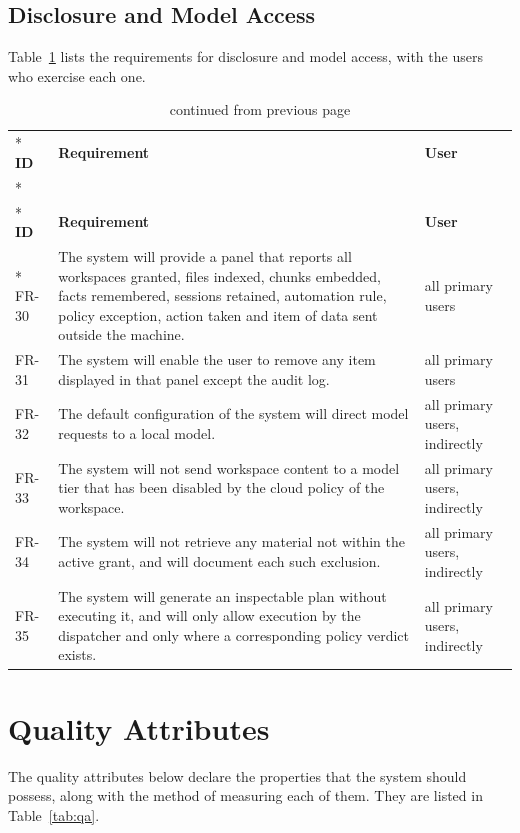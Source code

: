 \documentclass{FastFyp}
\begin{document}
\subsection{Disclosure and Model Access}
Table~\ref{tab:fr4} lists the requirements for disclosure and model access, with the users who exercise each one.

{\small
{}
\begin{longtable}{|p{1.3cm}|p{9.8cm}|p{3.0cm}|}
\caption{Functional requirements: disclosure and model access.}\label{tab:fr4}\\*
\hline
\textbf{ID} & \textbf{Requirement} & \textbf{User} \\*
\hline
\endfirsthead
\caption[]{continued from previous page}\\*
\hline
\textbf{ID} & \textbf{Requirement} & \textbf{User} \\*
\hline
\endhead
FR-30 & The system will provide a panel that reports all workspaces granted, files indexed, chunks embedded, facts remembered, sessions retained, automation rule, policy exception, action taken and item of data sent outside the machine. & all primary users \\
\hline
FR-31 & The system will enable the user to remove any item displayed in that panel except the audit log. & all primary users \\
\hline
FR-32 & The default configuration of the system will direct model requests to a local model. & all primary users, indirectly \\
\hline
FR-33 & The system will not send workspace content to a model tier that has been disabled by the cloud policy of the workspace. & all primary users, indirectly \\
\hline
FR-34 & The system will not retrieve any material not within the active grant, and will document each such exclusion. & all primary users, indirectly \\
\hline
FR-35 & The system will generate an inspectable plan without executing it, and will only allow execution by the dispatcher and only where a corresponding policy verdict exists. & all primary users, indirectly \\
\hline
\end{longtable}
}

\section{Quality Attributes}
The quality attributes below declare the properties that the system should possess, along with the method of measuring each of them. They are listed in Table~\ref{tab:qa}.
\end{document}
